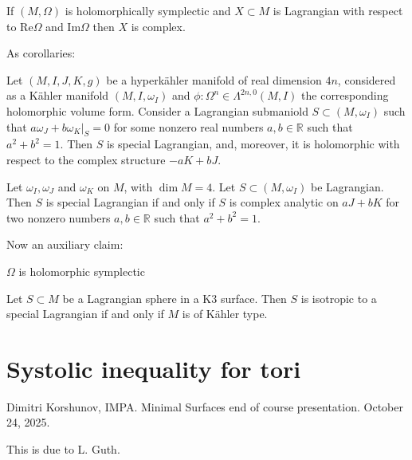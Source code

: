 \begin{lemma}[Hitchin]
\label{lemma-hitchin}
If $(M,\Omega)$ is holomorphically symplectic
and $X \subset M$
is Lagrangian with respect to
$\text{Re}\Omega$ and $\text{Im}\Omega$
then $X$ is complex.
\end{lemma}

\noindent
As corollaries:

\begin{lemma}
\label{lemma-corollary-hitchin}
Let $(M,I,J,K,g)$ be a hyperkähler manifold
of real dimension $4n$,
considered as a Kähler manifold
$(M,I,\omega_I)$ and $\phi:\Omega^n \in
\Lambda^{2n,0}(M,I)$ the corresponding
holomorphic volume form.
Consider a Lagrangian submaniold $S \subset
(M,\omega_I)$
such that $a \omega_J + b\omega_K|_S=0$ for
some nonzero real numbers
$a,b \in \mathbb{R}$ such that $a^2+b^2=1$.
Then $S$ is special Lagrangian, and,
moreover,
it is holomorphic with respect to the complex
structure
$-a K+b J$.
\end{lemma}

\begin{lemma}
\label{lemma-corollary2-hitchin}
Let $\omega_I,\omega_J$ and $\omega_K$ on
$M$, with $\dim M=4$.
Let $S \subset (M,\omega_I)$ be Lagrangian.
Then $S$ is special Lagrangian if and only if
$S$ is complex analytic
on $a J + b K$ for two nonzero numbers  $a,b
\in \mathbb{R}$ such that
$a^2+b^2=1$.
\end{lemma}

\noindent
Now an auxiliary claim:

\begin{lemma}
\label{lemma-k3-type}
$\Omega$ is holomorphic symplectic
\end{lemma}

\begin{theorem}
\label{theorem-}
Let $S\subset M$ be a Lagrangian sphere in a
K3 surface.
Then  $S$ is isotropic to a special
Lagrangian if and only if
$M$ is of Kähler type.
\end{theorem}


\section{Systolic inequality for tori}
\label{section-systolic-inequality}

\noindent
Dimitri Korshunov, IMPA.
Minimal Surfaces end of course presentation.
October 24, 2025.

\medskip\noindent
This is due to L. Guth.

